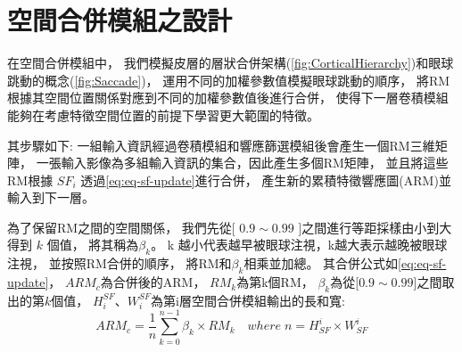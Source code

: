 \documentclass[class=NCU_thesis, crop=false]{standalone}
\begin{document}
\section{空間合併模組之設計}
		


	在空間合併模組中，
	我們模擬皮層的層狀合併架構(\cref{fig:CorticalHierarchy})和眼球跳動的概念(\cref{fig:Saccade})，
	運用不同的加權參數值模擬眼球跳動的順序，
	將RM根據其空間位置關係對應到不同的加權參數值後進行合併，
	使得下一層卷積模組能夠在考慮特徵空間位置的前提下學習更大範圍的特徵。

	其步驟如下:
	一組輸入資訊經過卷積模組和響應篩選模組後會產生一個RM三維矩陣，
	一張輸入影像為多組輸入資訊的集合，因此產生多個RM矩陣，
	並且將這些RM根據 $SF_{i}$ 透過\cref{eq:eq-sf-update}進行合併，
	產生新的累積特徵響應圖(ARM)並輸入到下一層。

	為了保留RM之間的空間關係，
	我們先從[ $0.9 \sim 0.99$ ]之間進行等距採樣由小到大得到 $k$ 個值，
	將其稱為$\beta_{k}$。
	k 越小代表越早被眼球注視，k越大表示越晚被眼球注視，
	並按照RM合併的順序，
	將RM和$\beta_{k}$相乘並加總。
	其合併公式如\cref{eq:eq-sf-update}，
	$ARM_{c}$為合併後的ARM，
	$RM_{k}$為第k個RM，
	$\beta_{k}$為從[$0.9 \sim 0.99$]之間取出的第$k$個值，
	${H}_{i}^{SF}$、${W}_{i}^{SF}$為第i層空間合併模組輸出的長和寬:\\
		\begin{equation}
		    \label{eq:eq-sf-update}
		    ARM_{c}=\frac{1}{n} \sum_{k = 0}^{n-1} \beta_{k} \times RM_{k}  \quad where \; n = \textit{H}^{i}_{SF} \times \textit{W}^{i}_{SF}
		\end{equation}
\end{document}
